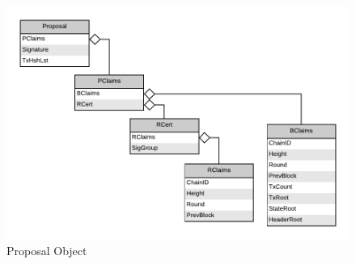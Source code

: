 \begin{figure}[H]
    \centering
    \includegraphics[scale=0.5]{figures/Proposal_Object.pdf}
    \caption{Proposal Object}
\end{figure}
